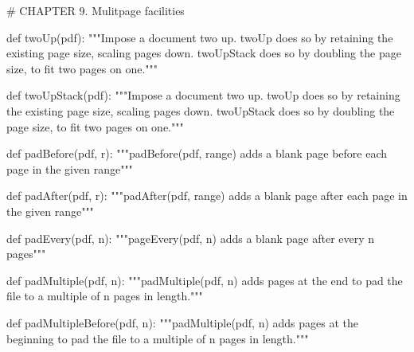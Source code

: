 # CHAPTER 9. Mulitpage facilities

def twoUp(pdf):
    """Impose a document two up. twoUp does so by retaining the existing page
    size, scaling pages down. twoUpStack does so by doubling the page size,
    to fit two pages on one."""

def twoUpStack(pdf):
    """Impose a document two up. twoUp does so by retaining the existing page
    size, scaling pages down. twoUpStack does so by doubling the page size,
    to fit two pages on one."""

def padBefore(pdf, r):
    """padBefore(pdf, range) adds a blank page before each page in the given
    range"""

def padAfter(pdf, r):
    """padAfter(pdf, range) adds a blank page after each page in the given
    range"""

def padEvery(pdf, n):
    """pageEvery(pdf, n) adds a blank page after every n pages"""

def padMultiple(pdf, n):
    """padMultiple(pdf, n) adds pages at the end to pad the file to a multiple
    of n pages in length."""

def padMultipleBefore(pdf, n):
    """padMultiple(pdf, n) adds pages at the beginning to pad the file to a
    multiple of n pages in length."""

